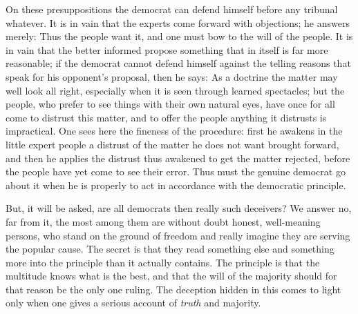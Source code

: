 \documentclass[12pt,a4paper,openany]{book}
\newcommand{\opage}[1]{\marginnote{\footnotesize\textit{[#1]}}}
\begin{document}
On these presuppositions the democrat can defend
himself before any tribunal whatever. It is
in vain that the experts come forward with objections;
he answers merely: Thus the people want it,
and one must bow to the will of the people. It is in vain
that the better informed propose something that
in itself is far more reasonable; if the democrat cannot
defend himself against the telling reasons that speak
for his opponent's proposal, then he says: As a doctrine
the matter may well look all right, especially when it
is seen through learned spectacles; but the people, who prefer to see
things with their own natural eyes, have once for all
\setcounter{footnote}{0}%
\opage{80}come to distrust this matter, and to offer the people anything
it distrusts is impractical. One sees here
the fineness of the procedure: first he awakens in the %
little expert people a distrust of the matter he does not
want brought forward, and then he applies the distrust thus awakened
to get the matter rejected, before the people have yet
come to see their error. Thus must
the genuine democrat go about it when he is properly to
act in accordance with the democratic
principle.

But, it will be asked, are all democrats then really
such deceivers? We answer no, far from it, the most
among them are without doubt honest, well-meaning persons,
who stand on the ground of freedom and really
imagine they are serving the popular cause. The secret
is that they read something else and something more into the principle
than it actually contains. The principle
is that the multitude knows what is the best, and
that the will of the majority should for that reason be the only one
ruling. The deception hidden in this comes to
light only when one gives a serious account of \emph{truth}
and majority.
\end{document}
